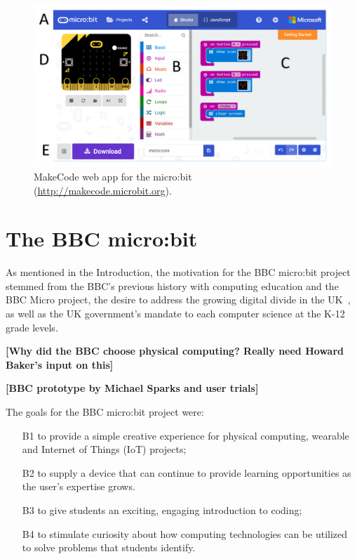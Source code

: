 \begin{figure}[t]
    \includegraphics[width=6in]{images/webApp.png}
    \caption{\label{fig:snapshot}MakeCode web app for the micro:bit (\url{http://makecode.microbit.org}).}
  \end{figure}

\section{The BBC micro:bit}
\label{sec:microbit}


As mentioned in the Introduction, the motivation for the BBC micro:bit project
stemmed from the BBC's previous history with computing education and the BBC Micro
project, the desire to address the growing digital divide in the UK~\cite{XYZ}, 
as well as the UK government's mandate to each computer science at the K-12 grade levels. 

{\bf [Why did the BBC choose physical computing? Really need Howard Baker's input on this]}

{\bf [BBC prototype by Michael Sparks and user trials] }

The goals for the BBC micro:bit project were:
\begin{itemize}
    \item[B1] to provide a simple creative experience for physical computing, wearable and Internet of Things (IoT) projects;
    \item[B2] to supply a device that can continue to provide learning opportunities as the user's expertise grows.
    \item[B3] to give students an exciting, engaging introduction to coding;
    \item[B4] to stimulate curiosity about how computing technologies can be utilized to solve problems that students identify.
\end{itemize}

